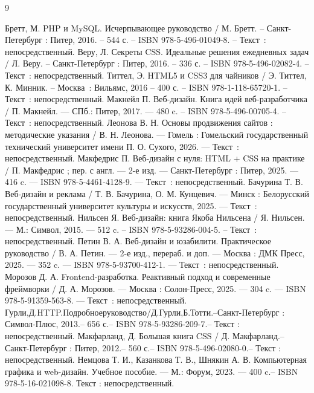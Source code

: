 
\begin{thebibliography}{9}
    
     Бретт, М. PHP и MySQL. Исчерпывающее руководство / М. Бретт. – Санкт-Петербург : Питер, 2016. – 544 с. – ISBN 978-5-496-01049-8. – Текст~: непосредственный.
     Веру, Л. Секреты CSS. Идеальные решения ежедневных задач / Л. Веру. – Санкт-Петербург : Питер, 2016. – 336 с. – ISBN 978-5-496-02082-4. – Текст~: непосредственный.
		Титтел, Э. HTML5 и CSS3 для чайников / Э. Титтел, К. Минник. – Москва~: Вильямс, 2016 – 400 с. – ISBN 978-1-118-65720-1. – Текст~: непосредственный.    
		Макнейл П. Веб-дизайн. Книга идей веб-разработчика / П. Макнейл. — СПб.: Питер, 2017. — 480 c. – ISBN 978-5-496-00705-4. – Текст~: непосредственный.
     Леонова В. Н. Основы продвижения сайтов : методические указания / В. Н. Леонова. — Гомель : Гомельский государственный технический университет имени П. О. Сухого, 2026. — Текст~: непосредственный.
     Макфедрис П. Веб-дизайн с нуля: HTML + CSS на практике / П. Макфедрис ; пер. с англ. — 2-е изд. — Санкт-Петербург : Питер, 2025. — 416 c. — ISBN 978-5-4461-4128-9. — Текст~: непосредственный.
     Бачурина Т. В. Веб-дизайн и реклама / Т. В. Бачурина, О. М. Кунцевич. — Минск : Белорусский государственный университет культуры и искусств, 2025. — Текст~: непосредственный.
    	 Нильсен Я. Веб-дизайн: книга Якоба Нильсена / Я. Нильсен. — М.: Символ, 2015. — 512 c. – ISBN 978-5-93286-004-5. – Текст~: непосредственный.
     Петин В. А. Веб-дизайн и юзабилити. Практическое руководство / В. А. Петин. — 2-е изд., перераб. и доп. — Москва : ДМК Пресс, 2025. — 352 c. — ISBN 978-5-93700-412-1. — Текст~: непосредственный.
     Морозов Д. А. Frontend-разработка. Реактивный подход и современные фреймворки / Д. А. Морозов. — Москва : Солон-Пресс, 2025. — 304 c. — ISBN 978-5-91359-563-8. — Текст~: непосредственный.
     Гурли,Д.HTTP.Подробноеруководство/Д.Гурли,Б.Тотти.–Санкт-Петербург : Символ-Плюс, 2013.– 656 с.– ISBN 978-5-93286-209-7.– Текст : непосредственный.
     Макфарланд, Д. Большая книга CSS / Д. Макфарланд.– Санкт-Петербург : Питер, 2012.– 560 с.– ISBN 978-5-496-02080-0.– Текст : непосредственный.
     Немцова Т. И., Казанкова Т. В., Шнякин А. В. Компьютерная графика и web-дизайн. Учебное пособие. — М.: Форум, 2023. — 400 c.– ISBN 978-5-16-021098-8. Текст : непосредственный.

\end{thebibliography}
